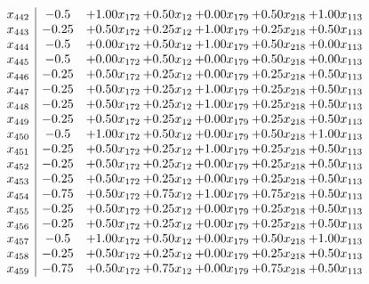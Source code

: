 \documentclass[8pt]{article}
\begin{document}
\[\begin{array}{c| c c@{\hskip 2pt} c@{\hskip 2pt} c@{\hskip 2pt} c@{\hskip 2pt} c@{\hskip 2pt} }
 x_{442}   &  -0.5 & +  1.00 x_{172} & +  0.50 x_{12} & +  0.00 x_{179} & +  0.50 x_{218} & +  1.00 x_{113}\\
 x_{443}   &  -0.25 & +  0.50 x_{172} & +  0.25 x_{12} & +  1.00 x_{179} & +  0.25 x_{218} & +  0.50 x_{113}\\
 x_{444}   &  -0.5 & +  0.00 x_{172} & +  0.50 x_{12} & +  1.00 x_{179} & +  0.50 x_{218} & +  0.00 x_{113}\\
 x_{445}   &  -0.5 & +  0.00 x_{172} & +  0.50 x_{12} & +  0.00 x_{179} & +  0.50 x_{218} & +  0.00 x_{113}\\
 x_{446}   &  -0.25 & +  0.50 x_{172} & +  0.25 x_{12} & +  0.00 x_{179} & +  0.25 x_{218} & +  0.50 x_{113}\\
 x_{447}   &  -0.25 & +  0.50 x_{172} & +  0.25 x_{12} & +  1.00 x_{179} & +  0.25 x_{218} & +  0.50 x_{113}\\
 x_{448}   &  -0.25 & +  0.50 x_{172} & +  0.25 x_{12} & +  1.00 x_{179} & +  0.25 x_{218} & +  0.50 x_{113}\\
 x_{449}   &  -0.25 & +  0.50 x_{172} & +  0.25 x_{12} & +  0.00 x_{179} & +  0.25 x_{218} & +  0.50 x_{113}\\
 x_{450}   &  -0.5 & +  1.00 x_{172} & +  0.50 x_{12} & +  0.00 x_{179} & +  0.50 x_{218} & +  1.00 x_{113}\\
 x_{451}   &  -0.25 & +  0.50 x_{172} & +  0.25 x_{12} & +  1.00 x_{179} & +  0.25 x_{218} & +  0.50 x_{113}\\
 x_{452}   &  -0.25 & +  0.50 x_{172} & +  0.25 x_{12} & +  0.00 x_{179} & +  0.25 x_{218} & +  0.50 x_{113}\\
 x_{453}   &  -0.25 & +  0.50 x_{172} & +  0.25 x_{12} & +  0.00 x_{179} & +  0.25 x_{218} & +  0.50 x_{113}\\
 x_{454}   &  -0.75 & +  0.50 x_{172} & +  0.75 x_{12} & +  1.00 x_{179} & +  0.75 x_{218} & +  0.50 x_{113}\\
 x_{455}   &  -0.25 & +  0.50 x_{172} & +  0.25 x_{12} & +  0.00 x_{179} & +  0.25 x_{218} & +  0.50 x_{113}\\
 x_{456}   &  -0.25 & +  0.50 x_{172} & +  0.25 x_{12} & +  0.00 x_{179} & +  0.25 x_{218} & +  0.50 x_{113}\\
 x_{457}   &  -0.5 & +  1.00 x_{172} & +  0.50 x_{12} & +  0.00 x_{179} & +  0.50 x_{218} & +  1.00 x_{113}\\
 x_{458}   &  -0.25 & +  0.50 x_{172} & +  0.25 x_{12} & +  0.00 x_{179} & +  0.25 x_{218} & +  0.50 x_{113}\\
 x_{459}   &  -0.75 & +  0.50 x_{172} & +  0.75 x_{12} & +  0.00 x_{179} & +  0.75 x_{218} & +  0.50 x_{113}\\

\end{array}\]
\end{document}
